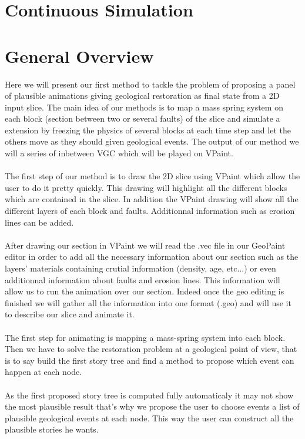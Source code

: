 \documentclass[12pt, a4paper]{memoir} %
\begin{document}
\section{Continuous Simulation}

\section{General Overview}

Here we will present our first method to tackle the problem of proposing a panel of plausible animations giving geological restoration as final state from a 2D input slice. 
The main idea of our methods is to map a mass spring system on each block (section between two or several faults) of the slice and simulate a extension by freezing the physics of several blocks at each time step and let the others move as they should given geological events. The output of our method we will a series of inbetween VGC which will be played on VPaint.\\\\
The first step of our method is to draw the 2D slice using VPaint which allow the user to do it pretty quickly.
This drawing will highlight all the different blocks which are contained in the slice.
In addition the VPaint drawing will show all the different layers of each block and faults. Additionnal information such as erosion lines can be added. \\\\
After drawing our section in VPaint we will read the .vec file in our GeoPaint editor in order to add all the necessary information about our section such as the layers' materials containing crutial information (density, age, etc...) or even  additionnal information about faults and erosion lines. This information will allow us to run the animation over our section.
Indeed once the geo editing is finished we will gather all the information into one format (.geo) and will use it to describe our slice and animate it.\\\\
The first step for animating is mapping a mass-spring system into each block. Then we have to solve the restoration problem at a geological point of view, that is to say build the first story tree and find a method to propose which event can happen at each node.\\\\
As the first proposed story tree is computed fully automaticaly it may not show the most plausible result that's why we propose the user to choose events a list of plausible geological events at each node.
This way the user can construct all the plausible stories he wants.
\end{document}
